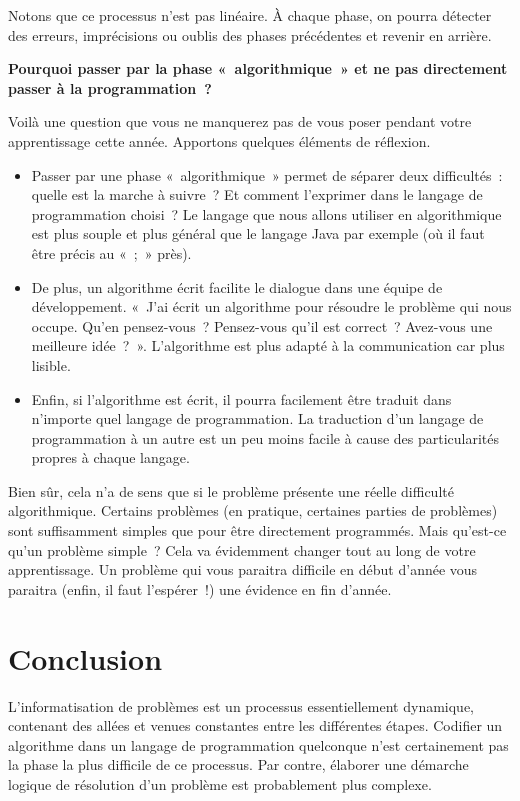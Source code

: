 		Notons que ce processus n’est pas linéaire. À chaque
		phase, on pourra détecter des erreurs, imprécisions ou oublis des
		phases précédentes et revenir en arrière.
	
		\textbf{Pourquoi passer par la phase «~algorithmique~» 
			et ne pas directement passer à la programmation~?}
		
		Voilà une question que vous ne manquerez pas de vous poser 
		pendant votre apprentissage cette année. 
		Apportons quelques éléments de réflexion.
	
		\begin{itemize}
		\item
			Passer par une phase «~algorithmique~» 
			permet de séparer deux difficultés~:~
			quelle est la marche à suivre~? 
			Et comment l’exprimer dans le langage de programmation choisi~? 
			Le langage que nous allons utiliser en algorithmique 
			est plus souple et plus général que le langage Java
			par exemple (où il faut être précis au «~;~» près).
		\item
			De plus, un algorithme écrit facilite le dialogue 
			dans une équipe de développement. 
			«~J’ai écrit un algorithme 
			pour résoudre le problème qui nous occupe. 
			Qu’en pensez-vous~? Pensez-vous qu’il est correct~?
			Avez-vous une meilleure idée~?~». 
			L’algorithme est plus adapté à la communication car plus lisible.
		\item
			Enfin, si l'algorithme est écrit, 
			il pourra facilement être traduit
			dans n’importe quel langage de programmation. 
			La traduction d’un langage de programmation à un autre
			est un peu moins facile 
			à cause des particularités propres à chaque langage.
		\end{itemize}
	
		Bien sûr, cela n’a de sens que si le problème présente
		une réelle difficulté algorithmique. 
		Certains problèmes (en pratique, certaines parties de problèmes) 
		sont suffisamment simples que pour être directement programmés. 
		Mais qu’est-ce qu’un problème simple~? 
		Cela va évidemment changer tout au long de votre apprentissage. 
		Un problème qui vous paraitra difficile en début d’année 
		vous paraitra (enfin, il faut l’espérer~!) 
		une évidence en fin d’année.
	
	\section{Conclusion}
	
		L’informatisation de problèmes 
		est un processus essentiellement dynamique, 
		contenant des allées et venues constantes 
		entre les différentes étapes. 
		Codifier un algorithme dans un langage de programmation quelconque 
		n’est certainement pas la phase la plus difficile de ce processus. 
		Par contre, élaborer une démarche logique de résolution 
		d’un problème est probablement plus complexe.
		

